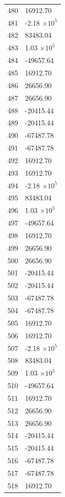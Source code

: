 \documentclass[a4paper,11pt]{article}
\begin{document}
\begin{center}
\begin{longtable}{|R{1.5cm}|R{2.6cm}|}
  480 &     16912.70 \\
  481 &        -2.18 $\times 10^{           5}$ \\
  482 &     83483.04 \\
  483 &         1.03 $\times 10^{           5}$ \\
  484 &    -49657.64 \\
  485 &     16912.70 \\
  486 &     26656.90 \\
  487 &     26656.90 \\
  488 &    -20415.44 \\
  489 &    -20415.44 \\
  490 &    -67487.78 \\
  491 &    -67487.78 \\
  492 &     16912.70 \\
  493 &     16912.70 \\
  494 &        -2.18 $\times 10^{           5}$ \\
  495 &     83483.04 \\
  496 &         1.03 $\times 10^{           5}$ \\
  497 &    -49657.64 \\
  498 &     16912.70 \\
  499 &     26656.90 \\
  500 &     26656.90 \\
  501 &    -20415.44 \\
  502 &    -20415.44 \\
  503 &    -67487.78 \\
  504 &    -67487.78 \\
  505 &     16912.70 \\
  506 &     16912.70 \\
  507 &        -2.18 $\times 10^{           5}$ \\
  508 &     83483.04 \\
  509 &         1.03 $\times 10^{           5}$ \\
  510 &    -49657.64 \\
  511 &     16912.70 \\
  512 &     26656.90 \\
  513 &     26656.90 \\
  514 &    -20415.44 \\
  515 &    -20415.44 \\
  516 &    -67487.78 \\
  517 &    -67487.78 \\
  518 &     16912.70 \\

\end{longtable}
\end{center}
\end{document}
